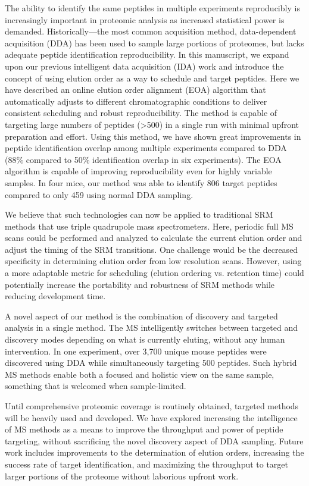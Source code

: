 The ability to identify the same peptides in multiple experiments reproducibly is increasingly important in proteomic analysis as increased statistical power is demanded. Historically---the most common acquisition method, data-dependent acquisition (DDA) has been used to sample large portions of proteomes, but lacks adequate peptide identification reproducibility. In this manuscript, we expand upon our previous intelligent data acquisition (IDA) work and introduce the concept of using elution order as a way to schedule and target peptides.  Here we have described an online elution order alignment (EOA) algorithm that automatically adjusts to different chromatographic conditions to deliver consistent scheduling and robust reproducibility. The method is capable of targeting large numbers of peptides (>500) in a single run with minimal upfront preparation and effort. Using this method, we have shown great improvements in peptide identification overlap among multiple experiments compared to DDA (88\% compared to 50\% identification overlap in six experiments). The EOA algorithm is capable of improving reproducibility even for highly variable samples. In four mice, our method was able to identify 806 target peptides compared to only 459 using normal DDA sampling. 

We believe that such technologies can now be applied to traditional SRM methods that use triple quadrupole mass spectrometers. Here, periodic full MS scans could be performed and analyzed to calculate the current elution order and adjust the timing of the SRM transitions. One challenge would be the decreased specificity in determining elution order from low resolution scans. However, using a more adaptable metric for scheduling (elution ordering vs. retention time) could potentially increase the portability and robustness of SRM methods while reducing development time. 

A novel aspect of our method is the combination of discovery and targeted analysis in a single method. The MS intelligently switches between targeted and discovery modes depending on what is currently eluting, without any human intervention. In one experiment, over 3,700 unique mouse peptides were discovered using DDA while simultaneously targeting 500 peptides. Such hybrid MS methods enable both a focused and holistic view on the same sample, something that is welcomed when sample-limited. 

Until comprehensive proteomic coverage is routinely obtained, targeted methods will be heavily used and developed. We have explored increasing the intelligence of MS methods as a means to improve the throughput and power of peptide targeting, without sacrificing the novel discovery aspect of DDA sampling. Future work includes improvements to the determination of elution orders, increasing the success rate of target identification, and maximizing the throughput to target larger portions of the proteome without laborious upfront work.

